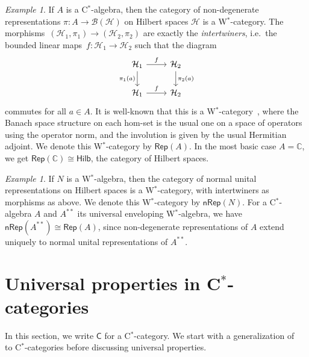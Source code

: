 \documentclass[reqno,T1,11pt]{amsproc}
\renewcommand{\H}{\mathcal{H}}	%
\newcommand{\B}[1]{\mathcal{B}(#1)}	%
\newcommand{\C}{\mathbb{C}}
\newcommand{\cat}[1]{\mathsf{#1}}		%
\newcommand{\Hilb}{\mathsf{Hilb}} 		%
\newcommand{\Rep}[1]{\mathsf{Rep}(#1)}		%
\newcommand{\NRep}[1]{\mathsf{nRep}(#1)}	%
\theoremstyle{plain}
\theoremstyle{remark}
\newtheorem{ex}[thm]{Example}
\numberwithin{equation}{section}
\begin{document}
\begin{ex}
\label{rep_ex}
If $A$ is a C$^*$-algebra, then the category of non-degenerate
representations $\pi : A \to \B{\H}$ on Hilbert spaces $\H$ is a
W$^*$-category. The morphisms~$(\H_1,\pi_1) \to (\H_2,\pi_2)$ are
exactly the \emph{intertwiners}, i.e.~the bounded linear maps~$f :
\H_1 \to \H_2$ such that the diagram
\[\begin{tikzcd}
	\H_1 \ar{r}{f} \ar[swap]{d}{\pi_1(a)} & \H_2 \ar{d}{\pi_2(a)} \\
	\H_1 \ar{r}{f} & \H_2
\end{tikzcd}\]
commutes for all $a\in A$. It is well-known that this is a W$^*$-category~\cite[Example~2.4]{wstarcat}, where the Banach space structure on each hom-set is the usual one on a space of operators using the operator norm, and the involution is given by the usual Hermitian adjoint. We denote this W$^*$-category by $\Rep{A}$. In the most basic case $A = \C$, we get $\Rep{\C} \cong \Hilb$, the category of Hilbert spaces.
\end{ex}

\begin{ex}
\label{nrep_ex}
If $N$ is a W$^*$-algebra, then the category of normal unital representations on Hilbert spaces is a W$^*$-category, with intertwiners as morphisms as above. We denote this W$^*$-category by $\NRep{N}$. For a C$^*$-algebra $A$ and $A^{**}$ its universal enveloping W$^*$-algebra, we have $\NRep{A^{**}} \cong \Rep{A}$, since non-degenerate representations of $A$ extend uniquely to normal unital representations of $A^{**}$.
\end{ex}

\section{Universal properties in C$^*$-categories}
\label{univ_props}

In this section, we write $\cat{C}$ for a C$^*$-category.
We start with a generalization of~\cite[Lemma 7]{westerbaan2016universal}
    to C$^*$-categories before discussing universal properties.
\end{document}
